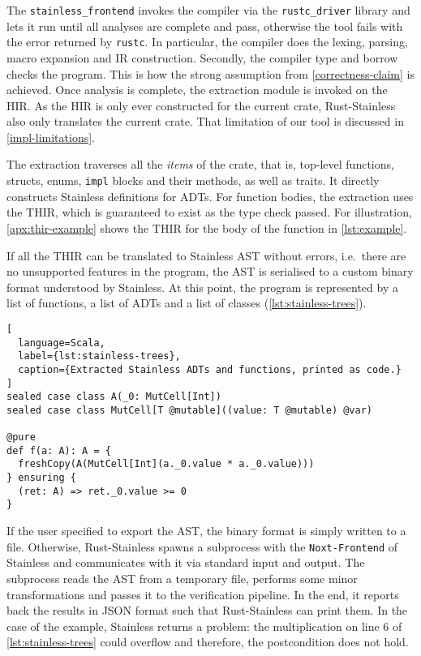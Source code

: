 The \lstinline!stainless_frontend! invokes the compiler via the
\lstinline!rustc_driver! library and lets it run until all analyses are complete
and pass, otherwise the tool fails with the error returned by \lstinline!rustc!.
In particular, the compiler does the lexing, parsing, macro expansion and IR
construction. Secondly, the compiler type and borrow checks the program. This is
how the strong assumption from \autoref{correctness-claim} is achieved. Once
analysis is complete, the extraction module is invoked on the HIR. As the HIR is
only ever constructed for the current crate, Rust-Stainless also only translates
the current crate. That limitation of our tool is discussed in
\autoref{impl-limitations}.

The extraction traverses all the \emph{items} of the crate, that is, top-level
functions, structs, enums, \lstinline!impl! blocks and their methods, as well as
traits. It directly constructs Stainless definitions for ADTs. For function
bodies, the extraction uses the THIR, which is guaranteed to exist as the type
check passed. For illustration, \autoref{apx:thir-example} shows the THIR for
the body of the function in \autoref{lst:example}.

If all the THIR can be translated to Stainless AST without errors, i.e.~there
are no unsupported features in the program, the AST is serialised to a custom
binary format understood by Stainless. At this point, the program is represented
by a list of functions, a list of ADTs and a list of classes
(\autoref{lst:stainless-trees}).

\begin{lstlisting}[
  language=Scala,
  label={lst:stainless-trees},
  caption={Extracted Stainless ADTs and functions, printed as code.}
]
sealed case class A(_0: MutCell[Int])
sealed case class MutCell[T @mutable]((value: T @mutable) @var)

@pure
def f(a: A): A = {
  freshCopy(A(MutCell[Int](a._0.value * a._0.value)))
} ensuring {
  (ret: A) => ret._0.value >= 0
}
\end{lstlisting}

If the user specified to export the AST, the binary format is simply written to
a file. Otherwise, Rust-Stainless spawns a subprocess with the
\lstinline!Noxt-Frontend! of Stainless and communicates with it via standard
input and output. The subprocess reads the AST from a temporary file, performs
some minor transformations and passes it to the verification pipeline. In the
end, it reports back the results in JSON format such that Rust-Stainless can
print them. In the case of the example, Stainless returns a problem: the
multiplication on line 6 of \autoref{lst:stainless-trees} could overflow and
therefore, the postcondition does not hold.



